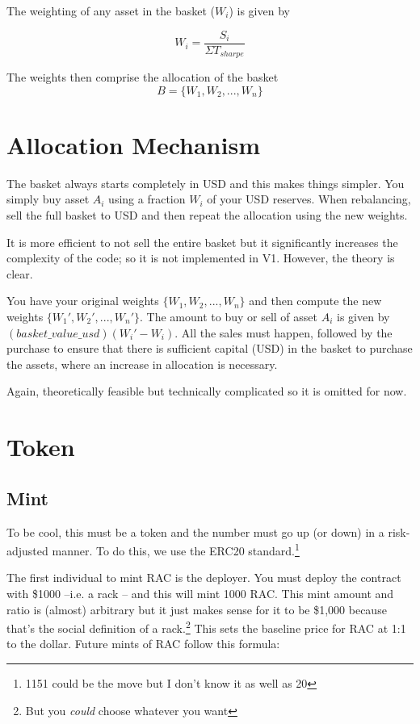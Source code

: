 \documentclass[11pt]{article}
\begin{document}
The weighting of any asset in the basket ($W_i$) is given by

\begin{equation}
W_i = \frac{S_i}{\Sigma T_{sharpe}}	
\end{equation}

The weights then comprise the allocation of the basket
\begin{equation}
	B = \{W_1,W_2,...,W_n\}
\end{equation}

\section{Allocation Mechanism}

The basket always starts completely in USD and this makes things simpler. You simply buy asset $A_i$ using a fraction $W_i$ of your USD reserves. When rebalancing, sell the full basket to USD and then repeat the allocation using the new weights. 

It is more efficient to not sell the entire basket but it significantly increases the complexity of the code; so it is not implemented in V1. However, the theory is clear. 

You have your original weights $\{W_1,W_2,...,W_n\}$ and then compute the new weights $\{W_1',W_2',...,W_n'\}$. The amount to buy or sell of asset $A_i$ is given by $(basket\_value\_usd)(W_i'  - W_i)$. All the sales must happen, followed by the purchase to ensure that there is sufficient capital (USD) in the basket to purchase the assets, where an increase in allocation is necessary. 

Again, theoretically feasible but technically complicated so it is omitted for now. 

\section{Token}

\subsection{Mint}

To be cool, this must be a token and the number must go up (or down) in a risk-adjusted manner. To do this, we use the ERC20 standard.\footnote{1151 could be the move but I don't know it as well as 20}

The first individual to mint RAC is the deployer. You must deploy the contract with \$1000 --i.e. a rack -- and this will mint 1000 RAC. This mint amount and ratio is (almost) arbitrary but it just makes sense for it to be \$1,000 because that's the social definition of a rack.\footnote{But you \emph{could} choose whatever you want} This sets the baseline price for RAC at 1:1 to the dollar. Future mints of RAC follow this formula:
\end{document}
